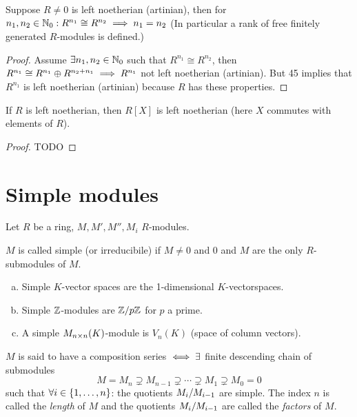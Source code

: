 \documentclass[a4paper]{report}
\begin{document}
\begin{cor}
  Suppose $R \ne 0$ is left noetherian (artinian), then for $n_{1}, n_{2} \in \mathbb{N}_0 : R^{n_{1}} \cong R^{n_{2}} \implies n_{1} = n_{2}$ (In particular a rank of free finitely generated $R$-modules is defined.)
  \begin{proof}
    Assume $\exists n_{1}, n_{2} \in \mathbb{N}_0$ such that $R^{n_{1}} \cong R^{n_{2}}$, then $R^{n_1} \cong R^{n_{1}} \oplus R^{n_{2} + n_{1}} \implies R^{n_{1}}$ not left noetherian (artinian). But 45 implies that $R^{n_1}$ is left noetherian (artinian) because $R$ has these properties. \qedhere
  \end{proof}
\end{cor}

\begin{thm}
  If $R$ is left noetherian, then $R[X]$ is left noetherian (here $X$ commutes with elements of $R$).
  \begin{proof}
    TODO
  \end{proof}
\end{thm}
\section{Simple modules}
Let $R$ be a ring, $M, M', M'', M_{i}$ $R$-modules.
\begin{defi}
$M$ is called simple (or irreducibile) if $M \ne 0$ and $0$ and $M$ are the only $R$-submodules of $M$.
\end{defi}
\begin{exmps}

  \begin{enumerate}[(a)]
    \item Simple $K$-vector spaces are the 1-dimensional $K$-vectorspaces.
    \item Simple $\mathbb{Z}$-modules are $\fak \Z{p\Z}$ for $p$ a prime.
          \item A simple $M_{n \times n}(K)$-module is $V_{n}(K)$ (space of column vectors).
  \end{enumerate}
\end{exmps}

\begin{defi}
  $M$ is said to have a composition series $\iff \exists$ finite descending chain of submodules \[M = M_{n} \supsetneq M_{n-1} \supsetneq \cdots \supsetneq M_{1} \supsetneq M_{0} = 0\]
  such that $\forall i \in \{1, \ldots, n\}$: the quotients $\fak{M_{i}}{M_{i-1}}$ are simple.
  The index $n$ is called the \emph{length} of $M$ and the quotients $\fak{M_{i}}{M_{i-1}}$ are called the \emph{factors} of $M$.
\end{defi}
\end{document}
